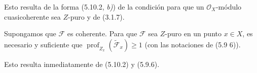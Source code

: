 
Esto resulta de la forma (5.10.2, \emph{b)}) de la condición para que un
$\mathcal O_X$-módulo cuasicoherente sea $Z$-puro y de (3.1.7).

\begin{corollary}[5.10.4]
\label{IV.2.s5.10.4-fr}
Supongamos que $\mathcal F$ es coherente. Para que $\mathcal F$ sea $Z$-puro
en un punto $x\in X$, es necesario y suficiente que
$\operatorname{prof}_{Z_x}(\widetilde{\mathcal F}_x)\geq1$
\textup{(}con las notaciones de \textup{(5.9 6))}.
\end{corollary}

Esto resulta inmediatamente de (5.10.2) y (5.9.6).

